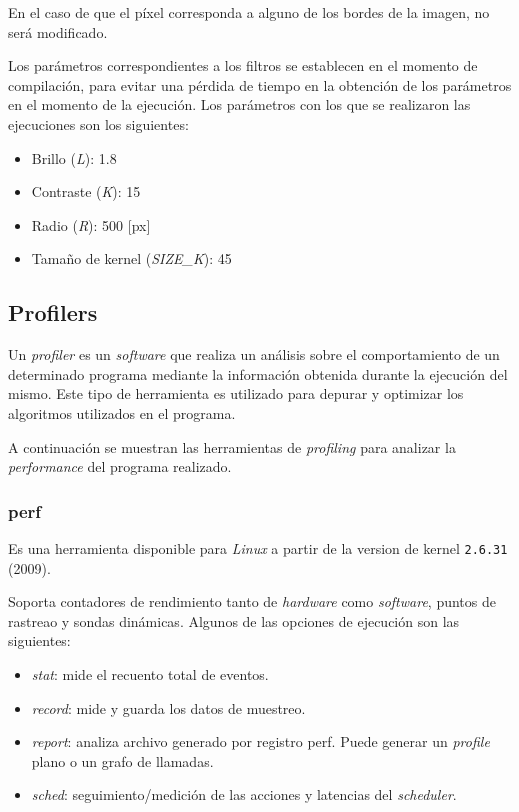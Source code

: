 \documentclass[12pt,a4paper]{article}
\begin{document}
En el caso de que el píxel corresponda a alguno de los bordes de la imagen,
no será modificado.

Los parámetros correspondientes a los filtros se establecen en el momento de
compilación, para evitar una pérdida de tiempo en la obtención de los
parámetros en el momento de la ejecución. Los parámetros con
los que se realizaron las ejecuciones son los siguientes:

\begin{itemize}[leftmargin=1.5cm]
  \item Brillo (\emph{L}): 1.8
  \item Contraste (\emph{K}): 15
  \item Radio (\emph{R}): 500 [px]
  \item Tamaño de kernel (\emph{SIZE\_K}): 45
\end{itemize}

\subsection{Profilers}
\label{prof}
Un \emph{profiler} es un \emph{software} que realiza un análisis sobre el
comportamiento de un determinado programa mediante la información obtenida
durante la ejecución del mismo.
Este tipo de herramienta es utilizado para depurar y optimizar los algoritmos
utilizados en el programa.

A continuación se muestran las herramientas de \emph{profiling} para analizar
la \emph{performance} del programa realizado.

\subsubsection{perf}
\label{perf}
Es una herramienta disponible para \emph{Linux} a partir de la version de
kernel \verb|2.6.31| (2009).

Soporta contadores de rendimiento tanto de \emph{hardware} como \emph{software},
puntos de rastreao y sondas dinámicas.
\newpage
Algunos de las opciones de ejecución son las siguientes:

\begin{itemize}[leftmargin=1.5cm]
  \item \emph{stat}: mide el recuento total de eventos.
  \item \emph{record}: mide y guarda los datos de muestreo.
  \item \emph{report}: analiza archivo generado por registro perf. Puede generar
  un \emph{profile} plano o un grafo de llamadas.
  \item \emph{sched}: seguimiento/medición de las acciones y latencias del
  \emph{scheduler}.
\end{itemize}
\end{document}
